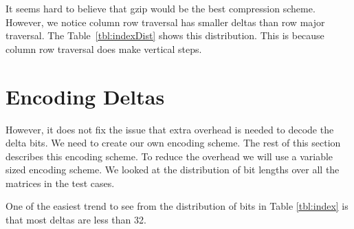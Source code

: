 It seems hard to believe that gzip would be the best compression scheme. However, we notice column row traversal has smaller deltas than row major traversal. The Table~\ref{tbl:indexDist} shows this distribution. This is because column row traversal does make vertical steps.
\section{Encoding Deltas}
However, it does not fix the issue that extra overhead is needed to decode the delta bits. We need to create our own encoding scheme. The rest of this section describes this encoding scheme. To reduce the overhead we will use a variable sized encoding scheme. We looked at the distribution of bit lengths over all the matrices in the test cases. \par



One of the easiest trend to see from the distribution of bits in Table \ref{tbl:index} is that most deltas are less than 32.%
